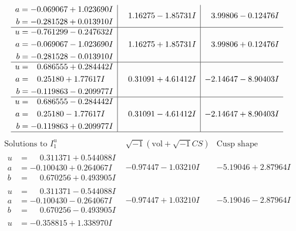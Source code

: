 \documentclass[1p]{elsarticle_modified}
\theoremstyle{definition}
\newcommand{\I}{\sqrt{-1}}
\begin{document}
$$\begin{array}{c|c|c}
\begin{aligned}
a &= -0.069067 + 1.023690 I \\
b &= -0.281528 + 0.013910 I\end{aligned}
 & \phantom{-}1.16275 - 1.85731 I & \phantom{-}3.99806 - 0.12476 I \\ \hline\begin{aligned}
u &= -0.761299 - 0.247632 I \\
a &= -0.069067 - 1.023690 I \\
b &= -0.281528 - 0.013910 I\end{aligned}
 & \phantom{-}1.16275 + 1.85731 I & \phantom{-}3.99806 + 0.12476 I \\ \hline\begin{aligned}
u &= \phantom{-}0.686555 + 0.284442 I \\
a &= \phantom{-}0.25180 + 1.77617 I \\
b &= -0.119863 - 0.209977 I\end{aligned}
 & \phantom{-}0.31091 + 4.61412 I & -2.14647 - 8.90403 I \\ \hline\begin{aligned}
u &= \phantom{-}0.686555 - 0.284442 I \\
a &= \phantom{-}0.25180 - 1.77617 I \\
b &= -0.119863 + 0.209977 I\end{aligned}
 & \phantom{-}0.31091 - 4.61412 I & -2.14647 + 8.90403 I\\
 \hline 
 \end{array}$$\newpage$$\begin{array}{c|c|c}  
\text{Solutions to }I^u_{1}& \I (\text{vol} + \sqrt{-1}CS) & \text{Cusp shape}\\
 \hline 
\begin{aligned}
u &= \phantom{-}0.311371 + 0.544088 I \\
a &= -0.100430 + 0.264067 I \\
b &= \phantom{-}0.670256 + 0.493905 I\end{aligned}
 & -0.97447 - 1.03210 I & -5.19046 + 2.87964 I \\ \hline\begin{aligned}
u &= \phantom{-}0.311371 - 0.544088 I \\
a &= -0.100430 - 0.264067 I \\
b &= \phantom{-}0.670256 - 0.493905 I\end{aligned}
 & -0.97447 + 1.03210 I & -5.19046 - 2.87964 I \\ \hline\begin{aligned}
u &= -0.358815 + 1.338970 I \\

\end{aligned}
\end{array}$$
\end{document}

